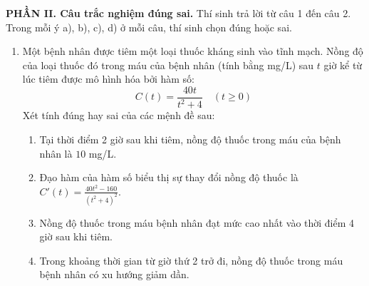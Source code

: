 \documentclass[12pt]{article}
\begin{document}
\begin{enumerate}[label=\textbf{Câu \arabic*.}, leftmargin=*]
	\end{enumerate}
	
	\vspace{4mm}
	
	\noindent\textbf{PHẦN II. Câu trắc nghiệm đúng sai.} Thí sinh trả lời từ câu 1 đến câu 2. Trong mỗi ý a), b), c), d) ở mỗi câu, thí sinh chọn đúng hoặc sai.
	\vspace{2mm}
	
	\begin{enumerate}[label=\textbf{Câu \arabic*.}, leftmargin=*]
		
	\item Một bệnh nhân được tiêm một loại thuốc kháng sinh vào tĩnh mạch. Nồng độ của loại thuốc đó trong máu của bệnh nhân (tính bằng mg/L) sau $t$ giờ kể từ lúc tiêm được mô hình hóa bởi hàm số:
	\[ C(t) = \frac{40t}{t^2 + 4} \quad (t \ge 0) \]
	Xét tính đúng hay sai của các mệnh đề sau:
	\begin{enumerate}[label=\alph*)]
		\item Tại thời điểm 2 giờ sau khi tiêm, nồng độ thuốc trong máu của bệnh nhân là $10$ mg/L.
		\item Đạo hàm của hàm số biểu thị sự thay đổi nồng độ thuốc là $C'(t) = \frac{40t^2 - 160}{(t^2 + 4)^2}$.
		\item Nồng độ thuốc trong máu bệnh nhân đạt mức cao nhất vào thời điểm 4 giờ sau khi tiêm.
		\item Trong khoảng thời gian từ giờ thứ 2 trở đi, nồng độ thuốc trong máu bệnh nhân có xu hướng giảm dần.
	\end{enumerate}
	

\end{enumerate}
\end{document}
